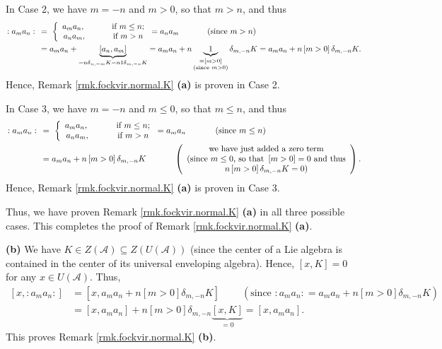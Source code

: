 \documentclass
[numbers=enddot,12pt,final,onecolumn,german,notitlepage]{scrartcl}%
\theoremstyle{definition}
\begin{document}
In Case 2, we have $m=-n$ and $m>0$, so that $m>n$, and thus%
\begin{align*}
\left.  :a_{m}a_{n}:\right.  \  &  =\ \left\{
\begin{array}
[c]{c}%
a_{m}a_{n},\ \ \ \ \ \ \ \ \ \ \text{if }m\leq n;\\
a_{n}a_{m},\ \ \ \ \ \ \ \ \ \ \text{if }m>n
\end{array}
\right.  =a_{n}a_{m}\ \ \ \ \ \ \ \ \ \ \left(  \text{since }m>n\right) \\
&  =a_{m}a_{n}+\underbrace{\left[  a_{n},a_{m}\right]  }_{=n\delta
_{n,-m}K=n1\delta_{m,-n}K}=a_{m}a_{n}+n\underbrace{1}_{\substack{=\left[
m>0\right]  \\\text{(since }m>0\text{)}}}\delta_{m,-n}K=a_{m}a_{n}+n\left[
m>0\right]  \delta_{m,-n}K.
\end{align*}
Hence, Remark \ref{rmk.fockvir.normal.K} \textbf{(a)} is proven in Case 2.

In Case 3, we have $m=-n$ and $m\leq0$, so that $m\leq n$, and thus%
\begin{align*}
\left.  :a_{m}a_{n}:\right.  \  &  =\ \left\{
\begin{array}
[c]{c}%
a_{m}a_{n},\ \ \ \ \ \ \ \ \ \ \text{if }m\leq n;\\
a_{n}a_{m},\ \ \ \ \ \ \ \ \ \ \text{if }m>n
\end{array}
\right.  =a_{m}a_{n}\ \ \ \ \ \ \ \ \ \ \left(  \text{since }m\leq n\right) \\
&  =a_{m}a_{n}+n\left[  m>0\right]  \delta_{m,-n}K\ \ \ \ \ \ \ \ \ \ \left(
\begin{array}
[c]{c}%
\text{we have just added a zero term}\\
\text{(since }m\leq0\text{, so that }\left[  m>0\right]  =0\text{ and thus}\\
n\left[  m>0\right]  \delta_{m,-n}K=0\text{)}%
\end{array}
\right)  .
\end{align*}
Hence, Remark \ref{rmk.fockvir.normal.K} \textbf{(a)} is proven in Case 3.

Thus, we have proven Remark \ref{rmk.fockvir.normal.K} \textbf{(a)} in all
three possible cases. This completes the proof of Remark
\ref{rmk.fockvir.normal.K} \textbf{(a)}.

\textbf{(b)} We have $K\in Z\left(  \mathcal{A}\right)  \subseteq Z\left(
U\left(  \mathcal{A}\right)  \right)  $ (since the center of a Lie algebra is
contained in the center of its universal enveloping algebra). Hence, $\left[
x,K\right]  =0$ for any $x\in U\left(  \mathcal{A}\right)  $. Thus,%
\begin{align*}
\left[  x,\left.  :a_{m}a_{n}:\right.  \right]   &  =\left[  x,a_{m}%
a_{n}+n\left[  m>0\right]  \delta_{m,-n}K\right]  \ \ \ \ \ \ \ \ \ \ \left(
\text{since }\left.  :a_{m}a_{n}:\right.  =a_{m}a_{n}+n\left[  m>0\right]
\delta_{m,-n}K\right) \\
&  =\left[  x,a_{m}a_{n}\right]  +n\left[  m>0\right]  \delta_{m,-n}%
\underbrace{\left[  x,K\right]  }_{=0}=\left[  x,a_{m}a_{n}\right]  .
\end{align*}
This proves Remark \ref{rmk.fockvir.normal.K} \textbf{(b)}.
\end{document}
